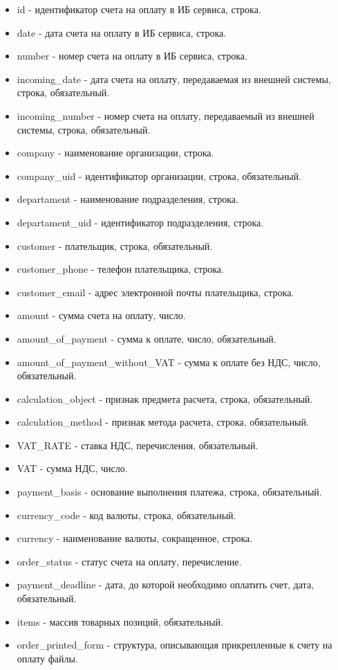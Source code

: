 \documentclass[11pt, a4paper]{article}
\begin{document}
\begin{itemize}
	\item id - идентификатор счета на оплату в ИБ сервиса, строка.
	\item date - дата счета на оплату в ИБ сервиса, строка.
	\item number - номер счета на оплату в ИБ сервиса, строка.
	\item incoming\_date - дата счета на оплату, передаваемая из внешней системы, строка, обязательный.
	\item incoming\_number - номер счета на оплату, передаваемый из внешней системы, строка, обязательный.
	\item company - наименование организации, строка.
	\item company\_uid - идентификатор организации, строка, обязательный.
	\item departament - наименование подразделения, строка.
	\item departament\_uid - идентификатор подразделения, строка.
	\item customer - плательщик, строка, обязательный.
	\item customer\_phone - телефон плательщика, строка.
	\item customer\_email - адрес электронной почты плательщика, строка.
	\item amount - сумма счета на оплату, число.
	\item amount\_of\_payment - сумма к оплате, число, обязательный.
	\item amount\_of\_payment\_without\_VAT - сумма к оплате без НДС, число, обязательный.
	\item calculation\_object - признак предмета расчета, строка, обязательный.
	\item calculation\_method - признак метода расчета, строка, обязательный.
	\item VAT\_RATE - ставка НДС, перечисления, обязательный.
	\item VAT - сумма НДС, число.
	\item payment\_basis - основание выполнения платежа, строка, обязательный.
	\item currency\_code - код валюты, строка, обязательный.
	\item currency - наименование валюты, сокращенное, строка.
	\item order\_status - статус счета на оплату, перечисление.
	\item payment\_deadline - дата, до которой необходимо оплатить счет, дата, обязательный.
	\item items - массив товарных позиций, обязательный.
	\item order\_printed\_form - структура, описывающая прикрепленные к счету на оплату файлы.
\end{itemize}
\end{document}
